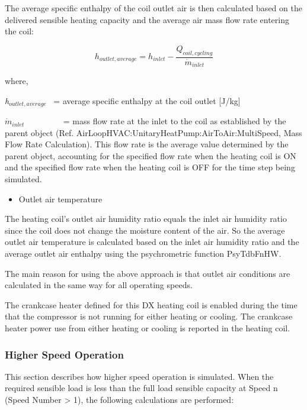 The average specific enthalpy of the coil outlet air is then calculated based on the delivered sensible heating capacity and the average air mass flow rate entering the coil:

\begin{equation}
  h_{outlet,average} = h_{inlet} - \frac{Q_{coil,cycling}}{\dot{m}_{inlet}}
\end{equation}

where,

\emph{h\(_{outlet,average}\)}~ = average specific enthalpy at the coil outlet {[}J/kg{]}

\({\dot m_{inlet}}\) ~~~~~~~~ = mass flow rate at the inlet to the coil as established by the parent object (Ref. AirLoopHVAC:UnitaryHeatPump:AirToAir:MultiSpeed, Mass Flow Rate Calculation). This flow rate is the average value determined by the parent object, accounting for the specified flow rate when the heating coil is ON and the specified flow rate when the heating coil is OFF for the time step being simulated.

\begin{itemize}
  \item Outlet air temperature
\end{itemize}

The heating coil's outlet air humidity ratio equals the inlet air humidity ratio since the coil does not change the moisture content of the air. So the average outlet air temperature is calculated based on the inlet air humidity ratio and the average outlet air enthalpy using the psychrometric function PsyTdbFnHW.

The main reason for using the above approach is that outlet air conditions are calculated in the same way for all operating speeds.

The crankcase heater defined for this DX heating coil is enabled during the time that the compressor is not running for either heating or cooling. The crankcase heater power use from either heating or cooling is reported in the heating coil.

\subsubsection{Higher Speed Operation}\label{higher-speed-operation-2}

This section describes how higher speed operation is simulated. When the required sensible load is less than the full load sensible capacity at Speed n (Speed Number \textgreater{} 1), the following calculations are performed:

